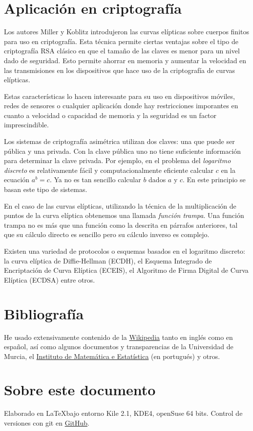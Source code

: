 \documentclass[a4,12pt]{article}
\begin{document}
\newpage
\section{Aplicación en criptografía}

Los autores Miller\cite{Miller85} y Koblitz\cite{Koblitz87} introdujeron las curvas elípticas sobre cuerpos finitos para uso en criptografía. Esta técnica permite ciertas ventajas sobre el tipo de criptografía RSA clásico en que el tamaño de las claves es menor para un nivel dado de seguridad. Esto permite ahorrar en memoria y aumentar la velocidad en las transmisiones en los dispositivos que hace uso de la criptografía de curvas elípticas. 

Estas características lo hacen interesante para su uso en dispositivos móviles, redes de sensores o cualquier aplicación donde hay restricciones imporantes en cuanto a velocidad o capacidad de memoria y la seguridad es un factor imprescindible.

Los sistemas de criptografía asimétrica utilizan dos claves: una que puede ser pública y una privada. Con la clave pública uno no tiene suficiente información para determinar la clave privada. Por ejemplo, en el problema del \emph{logaritmo discreto} es relativamente fácil y computacionalmente eficiente calcular $c$ en la ecuación $a^b=c$. Ya no es tan sencillo calcular $b$ dados $a$ y $c$. En este principio se basan este tipo de sistemas.

En el caso de las curvas elípticas, utilizando la técnica de la multiplicación de puntos de la curva elíptica obtenemos una llamada \emph{función trampa}. Una función trampa no es más que una función como la descrita en párrafos anteriores, tal que su cálculo directo es sencillo pero su cálculo inverso es complejo.

Existen una variedad de protocolos o esquemas basados en el logaritmo discreto: la curva elíptica de Diffie-Hellman (ECDH), el Esquema Integrado de Encriptación de Curva Elíptica (ECEIS), el Algoritmo de Firma Digital de Curva Elíptica (ECDSA) entre otros.

\newpage
\section{Bibliografía}
He usado extensivamente contenido de la \href{http://es.wikipedia.org}{Wikipedia} tanto en inglés como en español, así como algunos documentos y transparencias de la Universidad de Murcia, el \href{http://www.ime.usp.br/}{Instituto de Matemática e Estatística} (en portugués) y otros.

\appendix
\section{Sobre este documento}
Elaborado en \LaTeX bajo entorno Kile 2.1, KDE4, openSuse 64 bits. Control de versiones con git en \href{https://github.com/LeandroGuillen/AGP}{GitHub}.

\newpage

\end{document}
